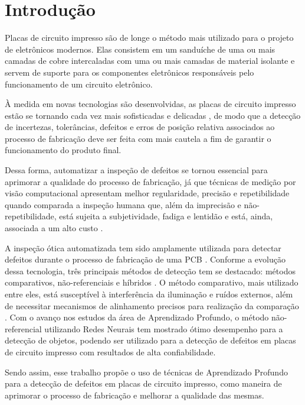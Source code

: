 \chapter{Introdução}
Placas de circuito impresso são de longe o método mais utilizado para o projeto de eletrônicos modernos. Elas consistem em um sanduíche de uma ou mais camadas de cobre intercaladas com uma ou mais camadas de material isolante \cite{ref:Zumbahlen} e servem de suporte para os componentes eletrônicos responsáveis pelo funcionamento de um circuito eletrônico.

À medida em novas tecnologias são desenvolvidas, as placas de circuito impresso estão se tornando cada vez mais sofisticadas e delicadas \cite{ref:Hu-Wang}, de modo que a detecção de incertezas, tolerâncias, defeitos e erros de posição relativa associados ao processo de fabricação \cite{ref:Leta-Feliciano-Martins} deve ser feita com mais cautela a fim de garantir o funcionamento do produto final.

Dessa forma, automatizar a inspeção de defeitos se tornou essencial para aprimorar a qualidade do processo de fabricação, já que técnicas de medição por visão computacional apresentam melhor regularidade, precisão e repetibilidade quando comparada a inspeção humana que, além da imprecisão e não-repetibilidade, está sujeita a subjetividade, fadiga e lentidão e está, ainda, associada a um alto custo \cite{ref:Leta-Feliciano-Martins}.

A inspeção ótica automatizada tem sido amplamente utilizada para detectar defeitos durante o processo de fabricação de uma PCB \cite{ref:Chin-Harlow}. Conforme a evolução dessa tecnologia, três principais métodos de detecção tem se destacado: métodos comparativos, não-referenciais e híbridos \cite{ref:Wu-Wang-Liu}. O método comparativo, mais utilizado entre eles, está susceptível à interferência da iluminação e ruídos externos, além de necessitar mecanismos de alinhamento precisos para realização da comparação \cite{ref:Hu-Wang}. Com o avanço nos estudos da área de Aprendizado Profundo, o método não-referencial utilizando Redes Neurais tem mostrado ótimo desempenho para a detecção de objetos, podendo ser utilizado para a detecção de defeitos em placas de circuito impresso com resultados de alta confiabilidade.

Sendo assim, esse trabalho propõe o uso de técnicas de Aprendizado Profundo para a detecção de defeitos em placas de circuito impresso, como maneira de aprimorar o processo de fabricação e melhorar a qualidade das mesmas.

